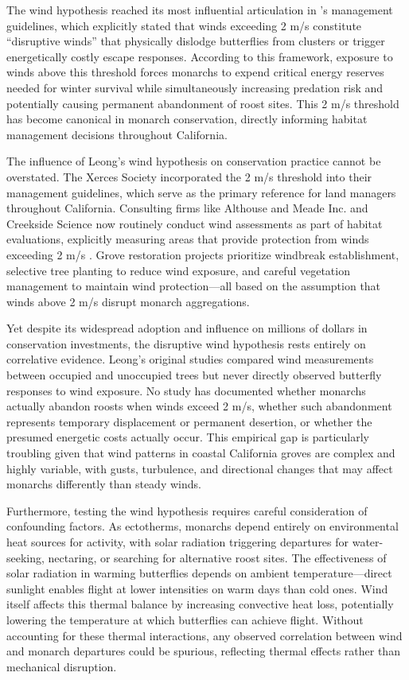 The wind hypothesis reached its most influential articulation in \citet{leongEvaluationManagementCalifornia2016}'s management guidelines, which explicitly stated that winds exceeding 2 m/s constitute ``disruptive winds'' that physically dislodge butterflies from clusters or trigger energetically costly escape responses. According to this framework, exposure to winds above this threshold forces monarchs to expend critical energy reserves needed for winter survival while simultaneously increasing predation risk and potentially causing permanent abandonment of roost sites. This 2 m/s threshold has become canonical in monarch conservation, directly informing habitat management decisions throughout California.

The influence of Leong's wind hypothesis on conservation practice cannot be overstated. The Xerces Society incorporated the 2 m/s threshold into their management guidelines, which serve as the primary reference for land managers throughout California. %
Consulting firms like Althouse and Meade Inc. and Creekside Science now routinely conduct wind assessments as part of habitat evaluations, explicitly measuring areas that provide protection from winds exceeding 2 m/s \citep{althouse&meadeinc.EllwoodMesaSperling2023}. Grove restoration projects prioritize windbreak establishment, selective tree planting to reduce wind exposure, and careful vegetation management to maintain wind protection---all based on the assumption that winds above 2 m/s disrupt monarch aggregations.

Yet despite its widespread adoption and influence on millions of dollars in conservation investments, the disruptive wind hypothesis rests entirely on correlative evidence. Leong's original studies compared wind measurements between occupied and unoccupied trees but never directly observed butterfly responses to wind exposure. No study has documented whether monarchs actually abandon roosts when winds exceed 2 m/s, whether such abandonment represents temporary displacement or permanent desertion, or whether the presumed energetic costs actually occur. This empirical gap is particularly troubling given that wind patterns in coastal California groves are complex and highly variable, with gusts, turbulence, and directional changes that may affect monarchs differently than steady winds.

Furthermore, testing the wind hypothesis requires careful consideration of confounding factors. As ectotherms, monarchs depend entirely on environmental heat sources for activity, with solar radiation triggering departures for water-seeking, nectaring, or searching for alternative roost sites. The effectiveness of solar radiation in warming butterflies depends on ambient temperature---direct sunlight enables flight at lower intensities on warm days than cold ones. Wind itself affects this thermal balance by increasing convective heat loss, potentially lowering the temperature at which butterflies can achieve flight. Without accounting for these thermal interactions, any observed correlation between wind and monarch departures could be spurious, reflecting thermal effects rather than mechanical disruption.

